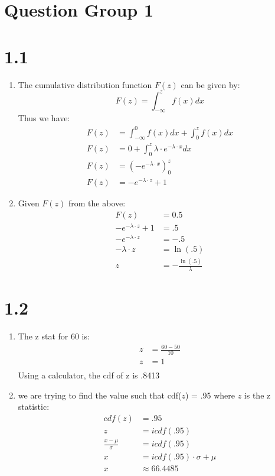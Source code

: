 \documentclass{article}
\title{\thetitle}
\author{\theauthor}
\begin{document}
\maketitle

\section*{Question Group 1}
\section*{1.1}
\begin{enumerate}
\item The cumulative distribution function $F(z)$ can be given by: \\
\[
F(z) = \int_{-\infty}^zf(x)dx
\]
Thus we have: \\
\begin{align*}
F(z) &= \int_{-\infty}^0f(x)dx + \int_{0}^{z}f(x)dx \\
F(z) &= 0 + \int_{0}^{z}\lambda \cdot e^{-\lambda \cdot x}dx \\
F(z) &= (-e^{-\lambda \cdot x})_0^z \\
F(z) &= -e^{-\lambda \cdot z} + 1
\end{align*}
\item Given $F(z)$ from the above: \\
\begin{align*}
F(z) &= 0.5 \\
-e^{-\lambda \cdot z} + 1 &= .5 \\
-e^{-\lambda \cdot z} &= -.5 \\
-\lambda \cdot z &= \ln(.5) \\
z &= -\frac{\ln(.5)}{\lambda}
\end{align*}
\end{enumerate}
\section*{1.2}
\begin{enumerate}
\item The z stat for 60 is: \\
\begin{align*}
z &= \frac{60 - 50}{10} \\
z &= 1 \\
\end{align*}
Using a calculator, the cdf of z is .8413
\item we are trying to find the value such that cdf($z$) = .95 where $z$ is the z statistic: \\
\begin{align*}
cdf(z) &= .95 \\
z &= icdf(.95) \\
\frac{x - \mu}{\sigma} &= icdf(.95) \\
x &= icdf(.95) \cdot \sigma + \mu \\
x &\approx 66.4485
\end{align*} 
\end{enumerate}
\end{document}
